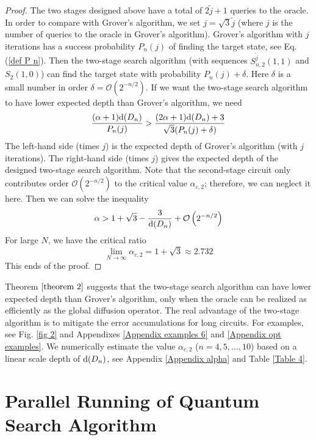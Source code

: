 \documentclass[%
 twocolumn,
 10pt,
 superscriptaddress,
 longbibliography,
 amsmath,amssymb,
 aps,
 pra,
floatfix,
]{revtex4-1}
\begin{document}
\begin{proof}
	The two stages designed above have a total of $2\tilde j+1$ queries to the oracle. In order to compare with Grover's algorithm, we set $j=\sqrt 3 \tilde j$ (where $j$ is the number of queries to the oracle in Grover's algorithm). Grover's algorithm with $j$ iterations has a success probability $P_n(j)$ of finding the target state, see Eq. (\ref{def P n}). Then the two-stage search algorithm (with sequences $S^{\tilde j}_{n,2}(1,1)$ and $S_{2}(1,0)$) can find the target state with probability $P_n(j)+\delta$. Here $\delta$ is a small number in order $\delta = \mathcal O(2^{-n/2})$. If we want the two-stage search algorithm to have lower expected depth than Grover's algorithm, we need
	\begin{equation}
		\frac{(\alpha+1)\text d(D_n)}{P_n(j)}>\frac{(2\alpha+1)\text d(D_n)+3}{\sqrt 3(P_n(j)+\delta)}
	\end{equation}
	The left-hand side (times $j$) is the expected depth of Grover's algorithm (with $j$ iterations). The right-hand side (times $j$) gives the expected depth of the designed two-stage search algorithm. Note that the second-stage circuit only contributes order $\mathcal O(2^{-n/2})$ to the critical value $\alpha_{c,2}$; therefore, we can neglect it here. Then we can solve the inequality
	\begin{equation}
		\alpha > 1+\sqrt 3 -\frac 3 {\text d(D_n)}+\mathcal O\left(2^{-n/2}\right)
	\end{equation}
	For large $N$, we have the critical ratio
	\begin{equation}
		\lim_{N\rightarrow\infty}\alpha_{c,2} = 1+\sqrt 3 \approx 2.732
	\end{equation}
	This ends of the proof.
\end{proof}

Theorem $\ref{theorem 2}$ suggests that the two-stage search algorithm can have lower expected depth than Grover's algorithm, only when the oracle can be realized as efficiently as the global diffusion operator. The real advantage of the two-stage algorithm is to mitigate the error accumulations for long circuits. For examples, see Fig. \ref{fig 2} and Appendixes \ref{Appendix examples 6} and \ref{Appendix opt examples}. We numerically estimate the value $\alpha_{c,2}$ ($n=4,5,\ldots,10$) based on a linear scale depth of $\text d(D_n)$, see Appendix \ref{Appendix alpha} and Table \ref{Table 4}.


\section{\label{sec:parallel}Parallel Running of Quantum Search Algorithm}
\end{document}
